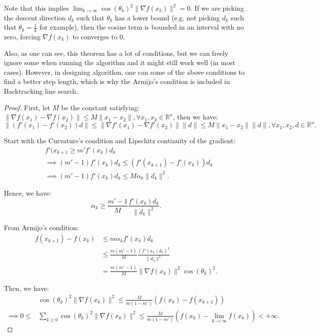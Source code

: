 Note that this implies \( \lim_{k \to \infty} \cos(\theta_{k})^2\|\nabla
f(x_{k})\|^2 = 0 \). If we are picking the descent direction \( d_{k} \) such
that \( \theta_{k} \) has a lower bound (e.g. not picking \( d_{k} \) such that
\( \theta_{k} = \frac{1}{k} \) for example), then the cosine term is bounded in
an interval with no zero, forcing \( \nabla f(x_{k}) \) to converges to \( 0 \).

Also, as one can see, this theorem has a lot of conditions, but we can freely
ignore some when running the algorithm and it might still work well (in most
cases). However, in designing algorithm, one can some of the above conditions to
find a better step length, which is why the Armijo's condition is included in
Backtracking line search.

\begin{proof}
  First, let \( M \) be the constant satisfying: \( \|\nabla f(x_{1})-\nabla
  f(x_{2})\| \le M\|x_{1}-x_{2}\|, \forall  x_{1}, x_{2} \in \mathbb{R}^{n}\),
  then we have:
  \[
    \|(f'(x_{1})-f'(x_{2}))d\| \le \|\nabla f'(x_{1})-\nabla f'(x_{2})\| \|d\|
    \le M\|x_{1}-x_{2}\|\|d\|, \forall  x_{1}, x_{2}, d \in \mathbb{R}^{n}
  .\] 

  Start with the Curvature's condition and Lipschitz continuity of the gradient:
  \begin{align*}
    &f'(x_{k + 1} \ge m'f'(x_{k})d_{k}\\
    &\implies (m' -
    1)f'(x_{k})d_{k} \le (f'(x_{k + 1}) - f'(x_{k}))d_{k}\\
    &\implies (m' -
    1)f'(x_{k})d_{k} \le M\alpha_{k}\|d_{k}\|^2
  .\end{align*}

  Hence, we have:
  \[
    \alpha_{k} \ge \frac{m'-1}{M} \frac{f'(x_{k})d_{k}}{\|d_{k}\|^2}
  .\] 

  From Armijo's condition:
  \begin{align*}
    f(x_{k + 1}) - f(x_{k}) &\le m\alpha_{k}f'(x_{k})d_{k} \\
                               &\le \frac{m(m' - 1)}{M}
                               \frac{(f'(x_{k})d_{k})^2}{\|d_{k}\|^2}\\
                               &= \frac{m(m'-1)}{M}\|\nabla f(x_{k})\|^2
                               \cos(\theta_{k})^2
  .\end{align*}

  Then, we have:
  \begin{align*}
    &\cos (\theta_{k})^2\|\nabla f(x_{k})\|^2 \le \frac{M}{m(1 - m')}
    (f(x_{k}) - f(x_{k + 1}))\\
    \implies 0 \le &\sum_{k \ge 0} \cos(\theta_{k})^2 \|\nabla f(x_{k})\|^2 \le
    \frac{M}{m(1-m')}(f(x_{0}) - \lim_{k \to \infty} f(x_{k})) < +\infty
  .\end{align*}
\end{proof}



